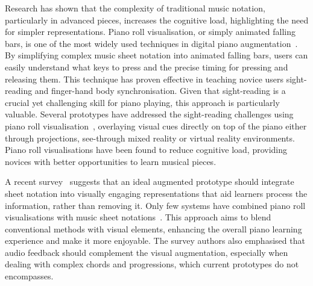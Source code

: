 \documentclass{vgtc}                          %
\begin{document}
\par Research has shown that the complexity of traditional music notation, particularly in advanced pieces, increases the cognitive load, %
highlighting the need for simpler representations. Piano roll visualisation, or simply animated falling bars, is one of the most widely used techniques in digital piano augmentation~\cite{deja2022survey}. By simplifying complex music sheet notation into animated falling bars, users can easily understand what keys to press and the precise timing for pressing and releasing them. This technique has proven effective in teaching novice users sight-reading and finger-hand body synchronisation. %
Given that sight-reading is a crucial yet challenging skill for piano playing, this approach is particularly valuable. Several prototypes have addressed the sight-reading challenges using piano roll visualisation~\cite{rogers2014piano, birhanu2017keynvision, sun2018mr, cai2019designb, weing2013piano, rogers2014piano}, overlaying visual cues directly on top of the piano either through projections, see-through mixed reality or virtual reality environments. Piano roll visualisations have been found to reduce cognitive load, providing novices with better opportunities to learn musical pieces. 

\par A recent survey~\cite{deja2022survey} suggests that an ideal augmented prototype should integrate sheet notation into visually engaging representations that aid learners process the information, rather than removing it. Only few systems have combined piano roll visualisations with music sheet notations~\cite{takegawa2012piano, yang2012augmented, yang2013visual}. This approach aims to blend conventional methods with visual elements, enhancing the overall piano learning experience and make it more enjoyable. %
The survey authors also emphasised that audio feedback should complement the visual augmentation, especially when dealing with complex chords and progressions, which current prototypes do not encompasses. %
\end{document}
